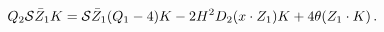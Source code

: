 \begin{equation}
Q_2{\cal S}\bar Z_1 K={\cal S}\bar Z_1(Q_1-4)K-2H^2D_2(x\cdot
Z_1)K+4\theta (Z_1\cdot K)\,.
\end{equation}

